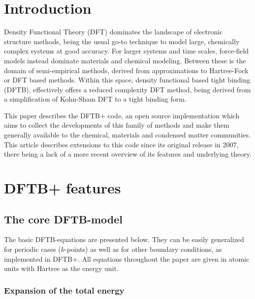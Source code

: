 \documentclass{revtex4-1}
\newcommand{\dftbp}{DFTB+}
\begin{document}
\maketitle

\section{Introduction}

Density Functional Theory (DFT)\cite{Hohenberg1964,Kohn1965} dominates the
landscape of electronic structure methods, being the usual go-to technique to
model large, chemically complex systems at good accuracy. For larger systems and
time scales, force-field models instead dominate materials and chemical
modeling. Between these is the domain of semi-empirical methods, derived from
approximations to Hartree-Fock or DFT based methods. Within this space, density
functional based tight binding (DFTB),\cite{Seifert1996,Porezag1995,Elstner1998}
effectively offers a reduced complexity DFT method, being derived from a
simplification of Kohn-Sham DFT to a tight binding
form.\cite{ElstnerSeifertBBA2014}

This paper describes the \dftbp{} code,\cite{dftbplus-repo} an
open source implementation which aims to collect the developments of this
family of methods and make them generally available to the chemical, materials
and condensed matter communities. This article describes extensions to this
code since its original release in 2007,\cite{aradi-jpca-2007} there being a
lack of a more recent overview of its features and underlying theory.

\section{\dftbp{} features}

\subsection{The core DFTB-model}

The basic DFTB-equations are presented below. They can be easily
generalized for periodic cases ($k$-points) as well as for other boundary
conditions, as implemented in \dftbp{}. All equations throughout the paper are
given in atomic units with Hartree as the energy unit.

\subsubsection{Expansion of the total energy}
\end{document}
